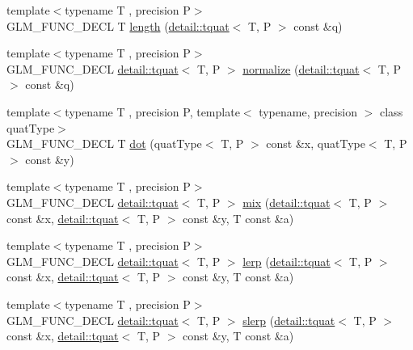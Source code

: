 \begin{DoxyCompactItemize}
\item 
{\footnotesize template$<$typename T , precision P$>$ }\\G\+L\+M\+\_\+\+F\+U\+N\+C\+\_\+\+D\+E\+CL T \hyperlink{group__gtc__quaternion_ga3406ab83e2cafd4034f359957e942410}{length} (\hyperlink{structglm_1_1detail_1_1tquat}{detail\+::tquat}$<$ T, P $>$ const \&q)
\item 
{\footnotesize template$<$typename T , precision P$>$ }\\G\+L\+M\+\_\+\+F\+U\+N\+C\+\_\+\+D\+E\+CL \hyperlink{structglm_1_1detail_1_1tquat}{detail\+::tquat}$<$ T, P $>$ \hyperlink{group__gtc__quaternion_ga34ee289ca53a08207904e935104715d8}{normalize} (\hyperlink{structglm_1_1detail_1_1tquat}{detail\+::tquat}$<$ T, P $>$ const \&q)
\item 
{\footnotesize template$<$typename T , precision P, template$<$ typename, precision $>$ class quat\+Type$>$ }\\G\+L\+M\+\_\+\+F\+U\+N\+C\+\_\+\+D\+E\+CL T \hyperlink{group__gtc__quaternion_gac54dfc83de465a2d03e90d342242ab3d}{dot} (quat\+Type$<$ T, P $>$ const \&x, quat\+Type$<$ T, P $>$ const \&y)
\item 
{\footnotesize template$<$typename T , precision P$>$ }\\G\+L\+M\+\_\+\+F\+U\+N\+C\+\_\+\+D\+E\+CL \hyperlink{structglm_1_1detail_1_1tquat}{detail\+::tquat}$<$ T, P $>$ \hyperlink{group__gtc__quaternion_gafabf175ae3e2cd30bf58dc313321955a}{mix} (\hyperlink{structglm_1_1detail_1_1tquat}{detail\+::tquat}$<$ T, P $>$ const \&x, \hyperlink{structglm_1_1detail_1_1tquat}{detail\+::tquat}$<$ T, P $>$ const \&y, T const \&a)
\item 
{\footnotesize template$<$typename T , precision P$>$ }\\G\+L\+M\+\_\+\+F\+U\+N\+C\+\_\+\+D\+E\+CL \hyperlink{structglm_1_1detail_1_1tquat}{detail\+::tquat}$<$ T, P $>$ \hyperlink{group__gtc__quaternion_gafc1c989eaa2c786d34218b176f680fe0}{lerp} (\hyperlink{structglm_1_1detail_1_1tquat}{detail\+::tquat}$<$ T, P $>$ const \&x, \hyperlink{structglm_1_1detail_1_1tquat}{detail\+::tquat}$<$ T, P $>$ const \&y, T const \&a)
\item 
{\footnotesize template$<$typename T , precision P$>$ }\\G\+L\+M\+\_\+\+F\+U\+N\+C\+\_\+\+D\+E\+CL \hyperlink{structglm_1_1detail_1_1tquat}{detail\+::tquat}$<$ T, P $>$ \hyperlink{group__gtc__quaternion_ga7468a211a20ea56ea5cfb0625226868a}{slerp} (\hyperlink{structglm_1_1detail_1_1tquat}{detail\+::tquat}$<$ T, P $>$ const \&x, \hyperlink{structglm_1_1detail_1_1tquat}{detail\+::tquat}$<$ T, P $>$ const \&y, T const \&a)

\end{DoxyCompactItemize}
